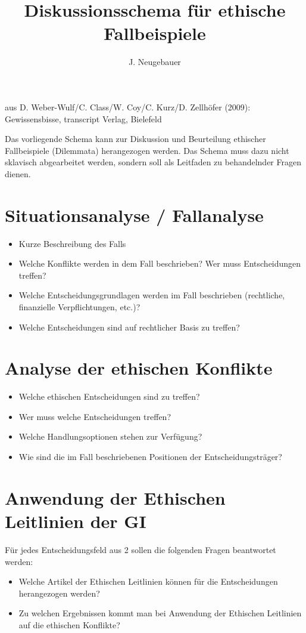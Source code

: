 \documentclass[11pt, a4paper]{scrartcl}
\author{J. Neugebauer}
\title{Diskussionsschema für ethische Fallbeispiele}
\date{\Heute}
\begin{document}
\TITEL

{\small aus D. Weber-Wulf/C. Class/W. Coy/C. Kurz/D. Zellhöfer (2009): Gewissensbisse, transcript Verlag, Bielefeld}\smallskip

Das vorliegende Schema kann zur Diskussion und Beurteilung ethischer Fallbeispiele (Dilemmata) herangezogen werden. Das Schema muss dazu nicht sklavisch abgearbeitet werden, sondern soll als Leitfaden zu behandelnder Fragen dienen.
\section{Situationsanalyse / Fallanalyse}
\begin{itemize}
	\item Kurze Beschreibung des Falls
	\item Welche Konflikte werden in dem Fall beschrieben? Wer muss Entscheidungen treffen?
	\item Welche Entscheidungsgrundlagen werden im Fall beschrieben (rechtliche, finanzielle Verpflichtungen, etc.)?
	\item Welche Entscheidungen sind auf rechtlicher Basis zu treffen?
\end{itemize}

\section{Analyse der ethischen Konflikte}
\begin{itemize}
	\item Welche ethischen Entscheidungen sind zu treffen?
	\item Wer muss welche Entscheidungen treffen?
	\item Welche Handlungsoptionen stehen zur Verfügung?
	\item Wie sind die im Fall beschriebenen Positionen der Entscheidungsträger?
\end{itemize}

\section{Anwendung der Ethischen Leitlinien der GI}	
Für jedes Entscheidungsfeld aus 2 sollen die folgenden Fragen beantwortet werden:
\begin{itemize}
	\item Welche Artikel der Ethischen Leitlinien können für die Entscheidungen herangezogen werden?
	\item Zu welchen Ergebnissen kommt man bei Anwendung der Ethischen Leitlinien auf die ethischen Konflikte?
\end{itemize}
\end{document}
